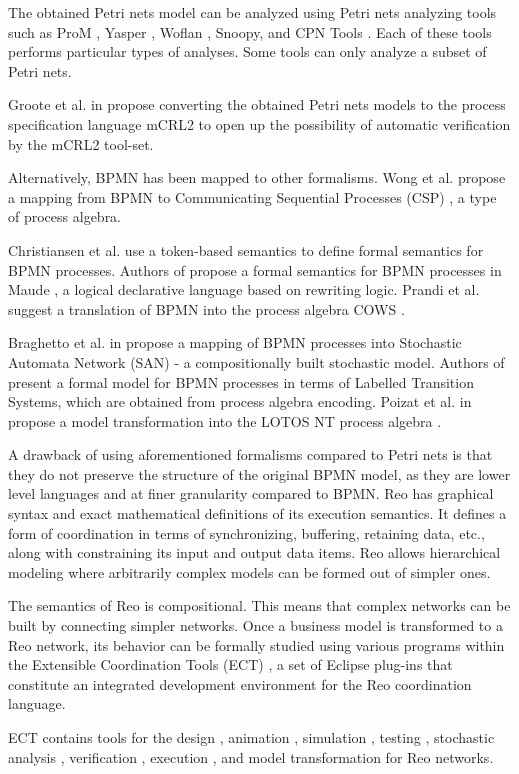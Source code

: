 The obtained Petri nets model can be analyzed using Petri nets analyzing tools such as ProM \cite{10.10071149474425}, Yasper
\cite{yasperrr}, Woflan \cite{DBLP:journals/itm/VerbeekAK04}, Snoopy\cite{10.1007/978-3-642-31131-422}, and CPN Tools \cite{DBLP:journals/sttt/JensenKW07}. Each of these tools performs
particular types of analyses. Some tools can only analyze a subset of Petri nets.

Groote et al. in  \cite{mcrl2} propose converting the obtained Petri nets models to
the process specification language mCRL2 to open up the possibility of
automatic verification by the mCRL2 tool-set.

Alternatively, BPMN has been mapped to other formalisms. Wong et al.
\cite{Wong2008APS} propose a mapping from BPMN to Communicating Sequential Processes
(CSP) \cite{Hoare:1985:CSP:3921}, a type of process algebra.  

Christiansen et al. \cite{101007978364219589110} use a token-based semantics to define formal semantics for BPMN processes. Authors of
\cite{20142630768} propose a formal semantics for BPMN processes in Maude \cite{DBLPjournalstcsClavelM02}, a logical
declarative language based on rewriting logic.  Prandi et al. \cite{PrandiQZ08} suggest a
translation of BPMN into the process algebra COWS \cite{cows}. 

Braghetto et al. in
\cite{braghetto:hal-00788815} propose a mapping of BPMN processes into Stochastic Automata Network
(SAN) \cite{DBLP:journals/tse/PlateauA91} - a compositionally built stochastic model. Authors of \cite{Mateescu14bpmn} present
a formal model for BPMN processes in terms of Labelled Transition Systems,
which are obtained from process algebra encoding. Poizat et al. in \cite{Poizatrealize} propose
a model transformation into the LOTOS NT process algebra \cite{Garavel2017}.

A drawback of using aforementioned formalisms compared to Petri nets is
that they do not preserve the structure of the original BPMN model, as they
are lower level languages and at finer granularity compared to BPMN.
Reo has graphical syntax and exact mathematical definitions of its execution
semantics. It defines a form of coordination in terms of synchronizing, buffering, retaining data, etc., along with constraining its input and output data
items. Reo allows hierarchical modeling where arbitrarily complex models can
be formed out of simpler ones. 

The semantics of Reo is compositional. This
means that complex networks can be built by connecting simpler networks.
 Once a business model is transformed to a Reo network, its behavior can
be formally studied using various programs within the Extensible Coordination
Tools (ECT) \cite{ect}, a set of Eclipse plug-ins that constitute an integrated development environment for the Reo coordination language. 

ECT contains tools for the design \cite{ect}, animation \cite{Krause11a}, simulation \cite{oscarmaster}, testing \cite{aichernig2009fault}, stochastic analysis \cite{ArbabCMM07}, verification \cite{Kppelholz2009688, KKdV10areo,Mousavi04-ReoTechRep}, execution \cite{JoseThesis,SFM-2015-ArbabJ,ect,Jongmans2012}, and model transformation \cite{behnaz,TVM+08,Krause201123} for Reo networks. 
